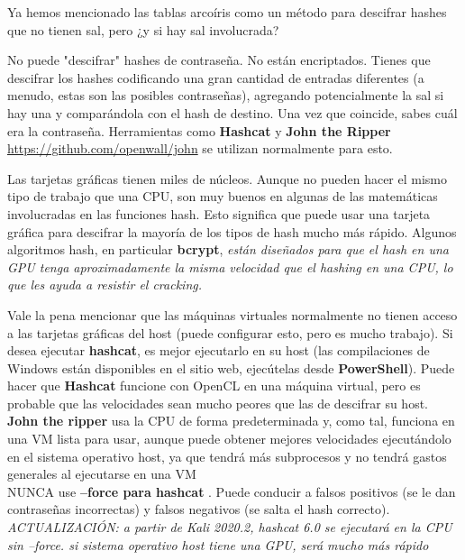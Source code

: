 Ya hemos mencionado las tablas arcoíris como un método para descifrar hashes que no tienen sal, pero ¿y si hay sal involucrada?

No puede "descifrar" hashes de contraseña. No están encriptados. Tienes que descifrar los hashes codificando una gran cantidad de entradas diferentes (a menudo, estas son las posibles contraseñas), agregando potencialmente la sal si hay una y comparándola con el hash de destino. Una vez que coincide, sabes cuál era la contraseña. Herramientas como \textbf{Hashcat} y \textbf{John the Ripper} \url{https://github.com/openwall/john} se utilizan normalmente para esto.

Las tarjetas gráficas tienen miles de núcleos. Aunque no pueden hacer el mismo tipo de trabajo que una CPU, son muy buenos en algunas de las matemáticas involucradas en las funciones hash. Esto significa que puede usar una tarjeta gráfica para descifrar la mayoría de los tipos de hash mucho más rápido. Algunos algoritmos hash, en particular \textbf{bcrypt}, \textit{están diseñados para que el hash en una GPU tenga aproximadamente la misma velocidad que el hashing en una CPU, lo que les ayuda a resistir el cracking.}

\begin{tcolorbox}
[colback=gray!5!white,colframe=orange!60!gray,title= GPU en máquinas virtuales para cracking]
Vale la pena mencionar que las máquinas virtuales normalmente no tienen acceso a las tarjetas gráficas del host (puede configurar esto, pero es mucho trabajo). Si desea ejecutar \textbf{hashcat}, es mejor ejecutarlo en su host (las compilaciones de Windows están disponibles en el sitio web, ejecútelas desde \textbf{PowerShell}). Puede hacer que \textbf{Hashcat} funcione con OpenCL en una máquina virtual, pero es probable que las velocidades sean mucho peores que las de descifrar su host. \textbf{John the ripper} usa la CPU de forma predeterminada y, como tal, funciona en una VM lista para usar, aunque puede obtener mejores velocidades ejecutándolo en el sistema operativo host, ya que tendrá más subprocesos y no tendrá gastos generales al ejecutarse en una VM\\ NUNCA use \textbf{--force para hashcat }. Puede conducir a falsos positivos (se le dan contraseñas incorrectas) y falsos negativos (se salta el hash correcto). \textit{ACTUALIZACIÓN: a partir de Kali 2020.2, hashcat 6.0 se ejecutará en la CPU sin --force. si sistema operativo host  tiene una GPU,  será mucho más rápido}
\end{tcolorbox}


